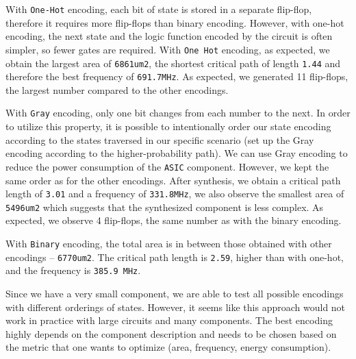 \documentclass[a4paper,11pt]{article}
\begin{document}
	\par With \texttt{One-Hot} encoding, each bit of state is stored in a separate flip-flop, therefore it requires more flip-flops than binary encoding. However, with one-hot encoding, the next state and the logic function encoded by the circuit is often simpler, so fewer gates are required. With \texttt{One Hot} encoding, as expected, we obtain the largest area of \texttt{6861um2}, the shortest critical path of length \texttt{1.44} and therefore the best frequency of \texttt{691.7MHz}. As expected, we generated 11 flip-flops, the largest number compared to the other encodings.

	\par With \texttt{Gray} encoding, only one bit changes from each number to the next. In order to utilize this property, it is possible to intentionally order our state encoding according to the states traversed in our specific scenario (set up the Gray encoding according to the higher-probability path). We can use Gray encoding to reduce the power consumption of the \texttt{ASIC} component. However, we kept the same order as for the other encodings. After synthesis, we obtain a critical path length of \texttt{3.01} and a frequency of \texttt{331.8MHz}, we also observe the smallest area of \texttt{5496um2} which suggests that the synthesized component is less complex. As expected, we observe 4 flip-flops, the same number as with the binary encoding.

	\par With \texttt{Binary} encoding, the total area is in between those obtained with other encodings – \texttt{6770um2}. The critical path length is \texttt{2.59}, higher than with one-hot, and the frequency is \texttt{385.9 MHz}.
	
	\par Since we have a very small component, we are able to test all possible encodings with different orderings of states. However, it seems like this approach would not work in practice with large circuits and many components. The best encoding highly depends on the component description and needs to be chosen based on the metric that one wants to optimize (area, frequency, energy consumption).
	
\end{document}

